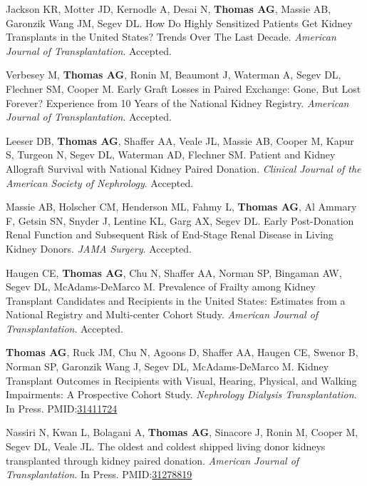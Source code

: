 \documentclass[10pt]{article}
\makeatletter
\newlength{\bibhang}
\newlength{\bibsep}
 {\@listi \global\bibsep\itemsep \global\advance\bibsep by\parsep}
\newenvironment{bibenum*}
  {\renewcommand\labelenumi{[\theenumi]}%
   \etaremune[
     topsep=0pt,
     itemsep=\bibsep,
     parsep=0pt,partopsep=0pt,
     itemindent=-\bibhang,
     leftmargin={\bibhang+\widthof{[999]}}]}
  {\endetaremune}
\newcommand{\pmid}[1]{PMID:\href{https://www.ncbi.nlm.nih.gov/pubmed/#1}{#1}}
\makeatother
\begin{document}
\begin{bibenum*}
\item Jackson KR\dag, Motter JD\dag, Kernodle A, Desai N, \textbf{Thomas AG},
 Massie AB, Garonzik Wang JM, Segev DL.
 How Do Highly Sensitized Patients Get Kidney Transplants in the
 United States? Trends Over The Last Decade.
  \emph{American Journal of Transplantation}. Accepted.

\item Verbesey M, \textbf{Thomas AG}, Ronin M, Beaumont J, Waterman A,
  Segev DL, Flechner SM, Cooper M. Early Graft Losses in Paired Exchange:
  Gone, But Lost Forever? Experience from 10 Years of the
  National Kidney Registry.
  \emph{American Journal of Transplantation}. Accepted.

\item Leeser DB, \textbf{Thomas AG}, Shaffer AA, Veale JL,
  Massie AB, Cooper M,
  Kapur S, Turgeon N, Segev DL, Waterman AD, Flechner SM.
  Patient and Kidney Allograft Survival with National Kidney Paired Donation.
  \emph{Clinical Journal of the American Society of Nephrology}. Accepted.

\item Massie AB, Holscher CM, Henderson ML, Fahmy L, \textbf{Thomas AG},
  Al Ammary F, Getsin SN, Snyder J, Lentine KL, Garg AX, Segev DL.
  Early Post-Donation Renal Function and Subsequent Risk of End-Stage
  Renal Disease in Living Kidney Donors.
 \emph{JAMA Surgery}. Accepted.

\item Haugen CE\dag, \textbf{Thomas AG\dag}, Chu N, Shaffer AA, Norman SP,
  Bingaman AW, Segev DL, McAdams-DeMarco M.
  Prevalence of Frailty among Kidney Transplant Candidates and Recipients
  in the United States: Estimates from a National Registry and Multi-center
  Cohort Study.
  \emph{American Journal of Transplantation}. Accepted.

\item \textbf{Thomas AG}, Ruck JM, Chu N, Agoons D, Shaffer AA, Haugen CE,
  Swenor B, Norman SP, Garonzik Wang J, Segev DL, McAdams-DeMarco M.
  Kidney Transplant Outcomes in Recipients with Visual, Hearing,
  Physical, and Walking Impairments: A Prospective Cohort Study.
  \emph{Nephrology Dialysis Transplantation}. In Press.
  \pmid{31411724} 

\item Nassiri N, Kwan L, Bolagani A, \textbf{Thomas AG}, Sinacore J, Ronin M,
  Cooper M, Segev DL, Veale JL.
  The oldest and coldest shipped living donor kidneys transplanted
  through kidney paired donation.
  \emph{American Journal of Transplantation}. In Press.
  \pmid{31278819} 


\end{bibenum*}
\end{document}
